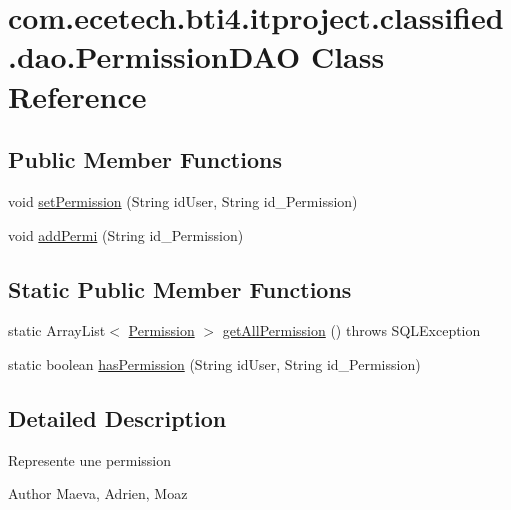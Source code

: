 \hypertarget{classcom_1_1ecetech_1_1bti4_1_1itproject_1_1classified_1_1dao_1_1_permission_d_a_o}{}\section{com.\+ecetech.\+bti4.\+itproject.\+classified.\+dao.\+Permission\+D\+AO Class Reference}
\label{classcom_1_1ecetech_1_1bti4_1_1itproject_1_1classified_1_1dao_1_1_permission_d_a_o}
\subsection*{Public Member Functions}
\begin{DoxyCompactItemize}
\item 
void \hyperlink{classcom_1_1ecetech_1_1bti4_1_1itproject_1_1classified_1_1dao_1_1_permission_d_a_o_a28a8d3624982b88f1dbf5849a82ac68a}{set\+Permission} (String id\+User, String id\+\_\+\+Permission)
\item 
void \hyperlink{classcom_1_1ecetech_1_1bti4_1_1itproject_1_1classified_1_1dao_1_1_permission_d_a_o_a144b1554142b1056f87331a20784ee15}{add\+Permi} (String id\+\_\+\+Permission)
\end{DoxyCompactItemize}
\subsection*{Static Public Member Functions}
\begin{DoxyCompactItemize}
\item 
static Array\+List$<$ \hyperlink{classcom_1_1ecetech_1_1bti4_1_1itproject_1_1classified_1_1beans_1_1_permission}{Permission} $>$ \hyperlink{classcom_1_1ecetech_1_1bti4_1_1itproject_1_1classified_1_1dao_1_1_permission_d_a_o_a35a54106c07cc5bb23e1b2c250f60b08}{get\+All\+Permission} ()  throws S\+Q\+L\+Exception 
\item 
static boolean \hyperlink{classcom_1_1ecetech_1_1bti4_1_1itproject_1_1classified_1_1dao_1_1_permission_d_a_o_a8f378b17fd7afa2048c46cf6566a3dd9}{has\+Permission} (String id\+User, String id\+\_\+\+Permission)
\end{DoxyCompactItemize}


\subsection{Detailed Description}
Represente une permission \begin{DoxyAuthor}{Author}
Maeva, Adrien, Moaz 
\end{DoxyAuthor}


